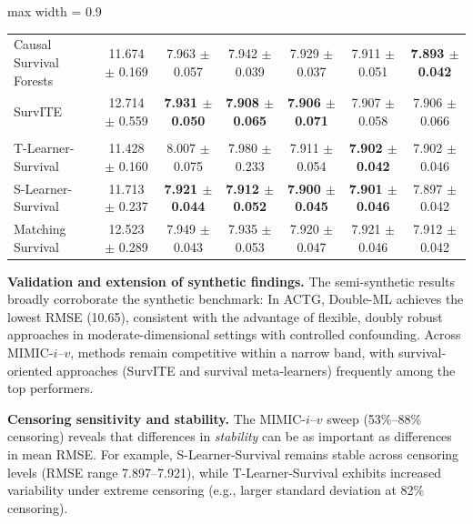 \documentclass{article} %
\begin{document}
\begin{table}[htbp]
\begin{center}
\begin{adjustbox}{max width = 0.9\textwidth}
\begin{tabular}{lcccccc}
        Causal Survival Forests & 11.674 $\pm$ 0.169 & 7.963 $\pm$ 0.057 & 7.942 $\pm$ 0.039 & 7.929 $\pm$ 0.037 & 7.911 $\pm$ 0.051 & \textbf{7.893 $\pm$ 0.042} \\ 
        SurvITE &  12.714 $\pm$ 0.559 &  \textbf{7.931 $\pm$ 0.050} &   \textbf{7.908 $\pm$ 0.065} &   \textbf{7.906 $\pm$ 0.071} &   7.907 $\pm$ 0.058 &  7.906 $\pm$ 0.066   \\ 
        \addlinespace %
        \multicolumn{7}{l}{\textit{Survival Meta-Learners}} \\
        T-Learner-Survival & 11.428 $\pm$ 0.160 & 8.007 $\pm$ 0.075 & 7.980 $\pm$ 0.233 & 7.911 $\pm$ 0.054 & \textbf{7.902 $\pm$ 0.042} & 7.902 $\pm$ 0.046 \\ 
        S-Learner-Survival & 11.713 $\pm$ 0.237 & \textbf{7.921 $\pm$ 0.044} & \textbf{7.912 $\pm$ 0.052} & \textbf{7.900 $\pm$ 0.045} & \textbf{7.901 $\pm$ 0.046} & 7.897 $\pm$ 0.042 \\ 
        Matching Survival & 12.523 $\pm$ 0.289 & 7.949 $\pm$ 0.043 & 7.935 $\pm$ 0.053 & 7.920 $\pm$ 0.047 & 7.921 $\pm$ 0.046 & 7.912 $\pm$ 0.042 \\
    \bottomrule
    \end{tabular}
    \end{adjustbox}
    \end{center}
\end{table}

\textbf{Validation and extension of synthetic findings.} The semi-synthetic results broadly corroborate the synthetic benchmark: In ACTG,  Double-ML achieves the lowest RMSE (10.65), consistent with the advantage of flexible, doubly robust approaches in moderate-dimensional settings with controlled confounding. Across MIMIC-$i$--$v$, methods remain competitive within a narrow band, with survival-oriented approaches (SurvITE and survival meta-learners) frequently among the top performers.

\textbf{Censoring sensitivity and stability.} The MIMIC-$i$--$v$ sweep (53\%--88\% censoring) reveals that differences in \emph{stability} can be as important as differences in mean RMSE. For example, S-Learner-Survival remains stable across censoring levels (RMSE range 7.897--7.921), while T-Learner-Survival exhibits increased variability under extreme censoring (e.g., larger standard deviation at 82\% censoring).
\end{document}
